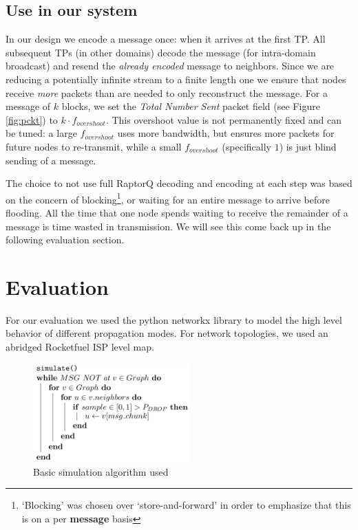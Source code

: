 \subsection{Use in our system}
In our design we encode a message once: when it arrives at the first TP. All subsequent TPs (in other domains) decode the message (for intra-domain broadcast) and resend the \textit{already encoded} message to neighbors. Since we are reducing a potentially infinite stream to a finite length one we ensure that nodes receive \textit{more} packets than are needed to only reconstruct the message. For a message of $k$ blocks, we set the \textit{Total Number Sent} packet field (see Figure \ref{fig:pckt}) to $k\cdot f_{overshoot}$. This overshoot value is not permanently fixed and can be tuned: a large $f_{overshoot}$ uses more bandwidth, but ensures more packets for future nodes to re-transmit, while a small $f_{overshoot}$ (specifically $1$) is just blind sending of a message.

The choice to not use full RaptorQ decoding and encoding at each step was based on the concern of blocking\footnote{`Blocking' was chosen over `store-and-forward' in order to emphasize that this is on a per \textbf{message} basis}, or waiting for an entire message to arrive before flooding. All the time that one node spends waiting to receive the remainder of a message is time wasted in transmission. We will see this come back up in the following evaluation section.

\section{Evaluation}
For our evaluation we used the python networkx library to model the high level behavior of different propagation modes.\cite{nwx}
For network topologies, we used an abridged Rocketfuel ISP level map. \cite{rocketfuel}

\begin{figure}[tp]
\centering
\includegraphics[width=6cm]{figures/algo_v2.png}
\caption{Basic simulation algorithm used}
\label{algo:a1}
\end{figure}

